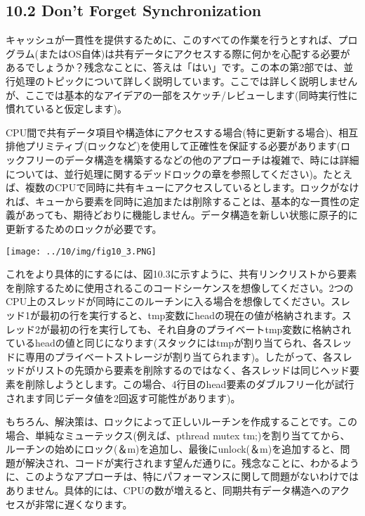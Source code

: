 \hypertarget{dont-forget-synchronization}{%
\subsection*{10.2 Don't Forget
Synchronization}\label{dont-forget-synchronization}}

キャッシュが一貫性を提供するために、このすべての作業を行うとすれば、プログラム(またはOS自体)は共有データにアクセスする際に何かを心配する必要があるでしょうか？残念なことに、答えは「はい」です。この本の第2部では、並行処理のトピックについて詳しく説明しています。ここでは詳しく説明しませんが、ここでは基本的なアイデアの一部をスケッチ/レビューします(同時実行性に慣れていると仮定します)。

CPU間で共有データ項目や構造体にアクセスする場合(特に更新する場合)、相互排他プリミティブ(ロックなど)を使用して正確性を保証する必要があります(ロックフリーのデータ構造を構築するなどの他のアプローチは複雑で、時には詳細については、並行処理に関するデッドロックの章を参照してください)。たとえば、複数のCPUで同時に共有キューにアクセスしているとします。ロックがなければ、キューから要素を同時に追加または削除することは、基本的な一貫性の定義があっても、期待どおりに機能しません。データ構造を新しい状態に原子的に更新するためのロックが必要です。

\texttt{[image: ../10/img/fig10\_3.PNG]}

これをより具体的にするには、図10.3に示すように、共有リンクリストから要素を削除するために使用されるこのコードシーケンスを想像してください。2つのCPU上のスレッドが同時にこのルーチンに入る場合を想像してください。スレッド1が最初の行を実行すると、tmp変数にheadの現在の値が格納されます。スレッド2が最初の行を実行しても、それ自身のプライベートtmp変数に格納されているheadの値と同じになります(スタックにはtmpが割り当てられ、各スレッドに専用のプライベートストレージが割り当てられます)。したがって、各スレッドがリストの先頭から要素を削除するのではなく、各スレッドは同じヘッド要素を削除しようとします。この場合、4行目のhead要素のダブルフリー化が試行されます同じデータ値を2回返す可能性があります)。

もちろん、解決策は、ロックによって正しいルーチンを作成することです。この場合、単純なミューテックス(例えば、pthread
mutex
tm;)を割り当ててから、ルーチンの始めにロック(＆m)を追加し、最後にunlock(＆m)を追加すると、問題が解決され、コードが実行されます望んだ通りに。残念なことに、わかるように、このようなアプローチは、特にパフォーマンスに関して問題がないわけではありません。具体的には、CPUの数が増えると、同期共有データ構造へのアクセスが非常に遅くなります。

